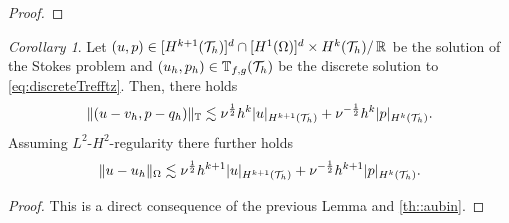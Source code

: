 \documentclass[pdflatex,sn-mathphys,Numbered]{sn-jnl}%
\theoremstyle{remark}%
\newtheorem{cor}[theorem]{Corollary}
\theoremstyle{definition}%
\begin{document}
\begin{proof}
\end{proof}



\begin{cor}
  Let $(u,p) \in [H^{k+1}({\mathcal{T}_h})]^d\cap [H^1(\Omega)]^d \times H^{k}({\mathcal{T}_h}) /\, \mathbb{R}$ be the solution of the Stokes problem and $(u_h,p_h) \in \mathbb{T}_{f,g}({\mathcal{T}_h})$ be the discrete solution to \eqref{eq:discreteTrefftz}. 
  Then, there holds
  \begin{equation} \label{eq:aprioribound1}
    \Vert (u-v_h,p-q_h) \Vert_{\mathbb{T}} \lesssim \nu^{\frac12} h^{k} \vert u \vert_{H^{k+1}({\mathcal{T}_h})} + \nu^{-\frac12} h^{k} \vert p \vert_{H^{k}({\mathcal{T}_h})}.
  \end{equation}
  Assuming $L^2$-$H^2$-regularity there further holds
  \begin{equation}
    \Vert u-u_h \Vert_{\Omega} \lesssim \nu^{\frac12} h^{k+1} \vert u \vert_{H^{k+1}({\mathcal{T}_h})} + \nu^{-\frac12} h^{k+1} \vert p \vert_{H^{k}({\mathcal{T}_h})}.
  \end{equation}
\end{cor}    
\begin{proof}
  This is a direct consequence of the previous Lemma and \cref{th::aubin}.
\end{proof}
\end{document}
